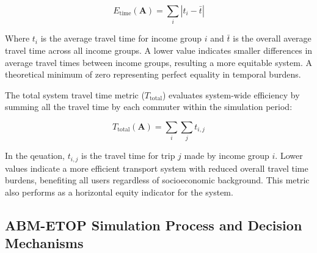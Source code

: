 \documentclass[a4paper,fleqn]{cas-sc}
\begin{document}
\begin{equation}
E_{\text{time}}(\mathbf{A}) = \sum_{i}|t_i - \bar{t}|
\end{equation}

Where $t_i$ is the average travel time for income group $i$ and $\bar{t}$ is the overall average travel time across all income groups. A lower value indicates smaller differences in average travel times between income groups, resulting a more equitable system. A theoretical minimum of zero representing perfect equality in temporal burdens.

The total system travel time metric ($T_{\text{total}}$) evaluates system-wide efficiency by summing all the travel time by each commuter within the simulation period:

\begin{equation}
T_{\text{total}}(\mathbf{A}) = \sum_{i}\sum_{j}t_{i,j}
\end{equation}

In the qeuation, $t_{i,j}$ is the travel time for trip $j$ made by income group $i$. Lower values indicate a more efficient transport system with reduced overall travel time burdens, benefiting all users regardless of socioeconomic background. This metric also performs as a horizontal equity indicator for the system. 

\subsection{ABM-ETOP Simulation Process and Decision Mechanisms}
\end{document}
